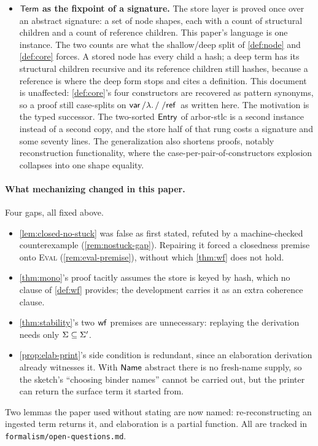 \documentclass[11pt]{article}
\theoremstyle{definition}
\theoremstyle{plain}
\theoremstyle{remark}
\begin{document}
\begin{itemize}[nosep]
  \cref{def:store}.
  \item \textbf{$\mathsf{Term}$ as the fixpoint of a signature.} The store layer is proved once over
  an abstract signature: a set of node shapes, each with a count of structural children and a
  count of reference children. This paper's language is one instance. The two counts are what
  the shallow/deep split of \cref{def:node} and \cref{def:core} forces. A stored node has every
  child a hash; a deep term has its structural children recursive and its reference children
  still hashes, because a reference is where the deep form stops and cites a definition. This
  document is unaffected: \cref{def:core}'s four constructors are recovered as pattern
  synonyms, so a proof still case-splits on $\mathsf{var}\,/\lambda.\,/\;/\mathsf{ref}\,$ as written here.
  The motivation is the typed successor. The two-sorted $\mathsf{Entry}$ of arbor-stlc is a second instance
  instead of a second copy, and the store half of that rung costs a signature and some seventy
  lines. The generalization also shortens proofs, notably reconstruction functionality, where
  the case-per-pair-of-constructors explosion collapses into one shape equality.
\end{itemize}

\paragraph{What mechanizing changed in this paper.} Four gaps, all fixed above.
\begin{itemize}[nosep]
  \item \cref{lem:closed-no-stuck} was false as first stated, refuted by a machine-checked
  counterexample (\cref{rem:nostuck-gap}). Repairing it forced a closedness premise onto
  \textsc{Eval} (\cref{rem:eval-premise}), without which \cref{thm:wf} does not hold.
  \item \cref{thm:mono}'s proof tacitly assumes the store is keyed by hash, which no clause of
  \cref{def:wf} provides; the development carries it as an extra coherence clause.
  \item \cref{thm:stability}'s two $\mathsf{wf}$ premises are unnecessary: replaying the derivation
  needs only $\Sigma \subseteq \Sigma'$.
  \item \cref{prop:elab-print}'s side condition is redundant, since an elaboration derivation
  already witnesses it. With $\mathsf{Name}$ abstract there is no fresh-name supply, so the sketch's
  ``choosing binder names'' cannot be carried out, but the printer can return the surface term
  it started from.
\end{itemize}
Two lemmas the paper used without stating are now named: re-reconstructing an ingested term
returns it, and elaboration is a partial function. All are tracked in
\texttt{formalism/open-questions.md}.
\end{document}
